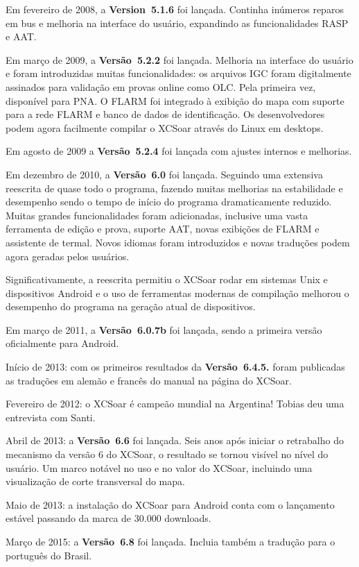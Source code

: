 Em fevereiro de 2008, a {\bf Version~5.1.6} foi lançada.  Continha inúmeros reparos em bus e melhoria na interface do usuário, expandindo as funcionalidades RASP e AAT. 

Em março de 2009, a {\bf Versão~5.2.2} foi lançada.  Melhoria na interface do usuário e foram introduzidas muitas funcionalidades: os arquivos IGC foram digitalmente assinados para validação em provas online como OLC.  Pela primeira vez, disponível para PNA.  O FLARM foi integrado à exibição do mapa com suporte para a rede FLARM e banco de dados de identificação.  Os desenvolvedores podem agora facilmente compilar o XCSoar através do Linux em desktops. 

Em agosto de 2009 a {\bf Versão~5.2.4} foi lançada com ajustes internos e melhorias.

Em dezembro de 2010, a {\bf Versão~6.0} foi lançada.  Seguindo uma extensiva reescrita de quase todo o programa, fazendo muitas melhorias na estabilidade e desempenho sendo o tempo de início do programa dramaticamente reduzido.  Muitas grandes funcionalidades foram adicionadas, inclusive uma vasta ferramenta de edição e prova, suporte AAT, novas exibições de FLARM e assistente de termal.   Novos idiomas foram introduzidos e novas traduções podem agora geradas pelos usuários.

Significativamente, a reescrita permitiu o XCSoar rodar em sistemas Unix e dispositivos Android e o uso de ferramentas modernas de compilação melhorou o desempenho do programa na geração atual de dispositivos.

Em março de 2011, a {\bf Versão~6.0.7b} foi lançada, sendo a primeira versão oficialmente para Android.

Início de 2013: com os primeiros resultados da {\bf Versão~6.4.5.} foram publicadas as traduções em alemão e francês do manual na página do XCSoar.

Fevereiro de 2012: o XCSoar é campeão mundial na Argentina! Tobias deu uma entrevista com Santi.

Abril de 2013: a {\bf Versão~6.6} foi lançada.  Seis anos após iniciar o retrabalho do mecanismo da versão 6  do XCSoar, o resultado se tornou visível no nível do usuário.  Um marco notável no uso e no valor do XCSoar, incluindo uma visualização de corte transversal do mapa.

Maio de 2013: a instalação do XCSoar para Android conta com o lançamento estável passando da marca de 30.000 downloads.

Março de 2015: a {\bf Versão~6.8} foi lançada.  Incluia também a tradução para o português do Brasil.


